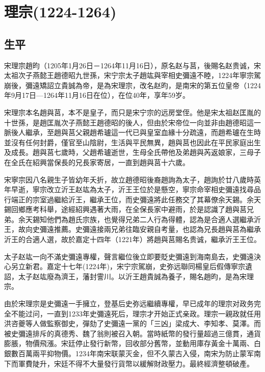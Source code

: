 
\section{理宗\tiny(1224-1264)}

\subsection{生平}

宋理宗趙昀（1205年1月26日－1264年11月16日），原名赵与莒，後賜名赵贵诚，宋太祖次子燕懿王趙德昭九世孫，宋宁宗太子趙竑與宰相史彌遠不睦，1224年寧宗駕崩後，彌遠矯詔立貴誠為帝，是為宋理宗，改名赵昀，是南宋的第五位皇帝（1224年9月17日—1264年11月16日在位），在位40年，享年59岁。

宋理宗本名趙與莒，本不是皇子，而只是宋宁宗的远房堂侄。他是宋太祖赵匡胤的十世孫，是趙匡胤次子燕懿王趙德昭的後人，但由於宋帝位一向並非由趙德昭這一脈後人繼承，至趙與莒父親趙希瓐這一代已與皇室血緣十分疏遠，而趙希瓐在生時並沒有任何封爵，僅官至山陰尉，生活與平民無異，趙與莒也因此在平民家庭出生及成長。趙與莒七歲時，父趙希瓐逝世，生母全氏帶他及弟趙與芮返娘家，三母子在全氏在紹興當保長的兄長家寄居，一直到趙與莒十六歲。

宋寧宗因八名親生子皆幼年夭折，故立趙德昭後裔趙詢為太子，趙詢於廿八歲時英年早逝，寧宗改立沂王赵竑為太子，沂王王位於是懸空，寧宗命宰相史彌遠找尋品行端正的宗室過繼給沂王，繼承王位，而史彌遠將此任務交了其幕僚余天錫。余天錫回鄉應考科舉，途經紹興遇著大雨，在全保長家中避雨，於是認識了趙與莒兄弟。余天錫知他們為趙氏宗族，也覺得兄弟二人行為得體，認為是合適人選繼承沂王，故向史彌遠推薦。史彌遠接兩兄弟往臨安親自考量，也認為兄長趙與莒為繼承沂王的合適人選，故於嘉定十四年（1221年）將趙與莒賜名贵诚，繼承沂王王位。

太子赵竑一向不滿史彌遠專權，聲言繼位後立即要貶史彌遠到海南島去，史彌遠決心另立新君。嘉定十七年(1224年)，宋宁宗駕崩，史弥远聯同楊皇后假傳寧宗遺詔，太子赵竑廢為濟王，藩封霅川。以沂王趙貴誠為養子，賜名趙昀，是為宋理宗。

由於宋理宗是史彌遠一手擁立，登基后史弥远繼續專權，早已成年的理宗对政务完全不能过问，一直到1233年史彌遠死后，理宗才开始正式亲政。理宗一親政就任用洪咨夔等人做監察御史，彈劾了史彌遠一黨的「三凶」梁成大、李知孝、莫澤。而被史彌遠排斥的真德秀、魏了翁則被召入朝。當時紙幣的發行量超過三億貫，通貨膨脹，物價飛漲。宋廷停止發行新幣，回收部分舊幣，並動用庫存黃金十萬兩、白銀數百萬兩平抑物價。1234年南宋联蒙灭金，但不久蒙古入侵，南宋为防止蒙军南下而軍費陡升，宋廷不得不大量發行貨幣以緩解財政壓力。最終經濟整頓破產。

